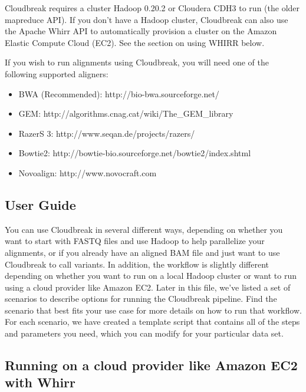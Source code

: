 \documentclass[11pt]{article}
\begin{document}
Cloudbreak requires a cluster Hadoop 0.20.2 or Cloudera CDH3 to run (the older
mapreduce API). If you don't have a Hadoop cluster, Cloudbreak can also use the
Apache Whirr API to automatically provision a cluster on the Amazon Elastic
Compute Cloud (EC2). See the section on using WHIRR below.

If you wish to run alignments using Cloudbreak, you will need one of the following
supported aligners:

\begin{itemize}
\item BWA (Recommended): http:/\slash bio-bwa.sourceforge.net\slash 

\item GEM: http:/\slash algorithms.cnag.cat\slash wiki\slash The\_GEM\_library

\item RazerS 3: http:/\slash www.seqan.de\slash projects\slash razers\slash 

\item Bowtie2: http:/\slash bowtie-bio.sourceforge.net\slash bowtie2\slash index.shtml

\item Novoalign: http:/\slash www.novocraft.com

\end{itemize}

\subsection{User Guide}
\label{userguide}

You can use Cloudbreak in several different ways, depending on whether you want
to start with FASTQ files and use Hadoop to help parallelize your alignments, or if you already
have an aligned BAM file and just want to use Cloudbreak to call variants. In addition,
the workflow is slightly different depending on whether you want to run on a local
Hadoop cluster or want to run using a cloud provider like Amazon EC2. Later in this
file, we've listed a set of scenarios to describe options for running the Cloudbreak
pipeline. Find the scenario that best fits your use case for more details on how to
run that workflow. For each scenario, we have created a template script that contains
all of the steps and parameters you need, which you can modify for your particular data set.

\subsection{Running on a cloud provider like Amazon EC2 with Whirr}
\label{runningonacloudproviderlikeamazonec2withwhirr}
\end{document}
